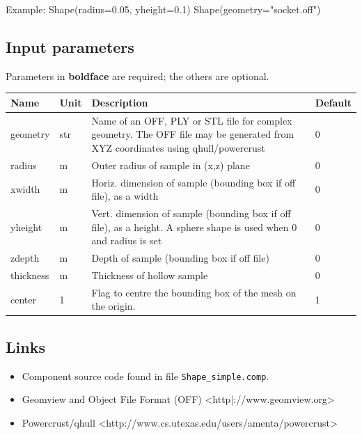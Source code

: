 Example: Shape(radius=0.05, yheight=0.1) Shape(geometry="socket.off")

\subsection*{Input parameters}
Parameters in \textbf{boldface} are required; the others are optional.

\begin{longtable}{p{}p{}p{}p{}}
\toprule
\textbf{Name} & \textbf{Unit} & \textbf{Description} & \textbf{Default} \\
\midrule
\endhead
geometry & str & Name of an OFF, PLY or STL file for complex geometry. The OFF file may be generated from XYZ coordinates using qhull/powercrust & 0 \\
radius & m & Outer radius of sample in (x,z) plane & 0 \\
xwidth & m & Horiz. dimension of sample (bounding box if off file), as a width & 0 \\
yheight & m & Vert.  dimension of sample (bounding box if off file), as a height. A sphere shape is used when 0 and radius is set & 0 \\
zdepth & m & Depth of sample (bounding box if off file) & 0 \\
thickness & m & Thickness of hollow sample & 0 \\
center & 1 & Flag to centre the bounding box of the mesh on the origin. & 1 \\
\bottomrule
\end{longtable}

\subsection*{Links}
\begin{itemize}
  \item Component source code found in file \texttt{Shape\_simple.comp}.
  \item Geomview and Object File Format (OFF) \textless{}http|://www.geomview.org\textgreater{}
  \item Powercrust/qhull \textless{}http://www.cs.utexas.edu/users/amenta/powercrust\textgreater{}
\end{itemize}
